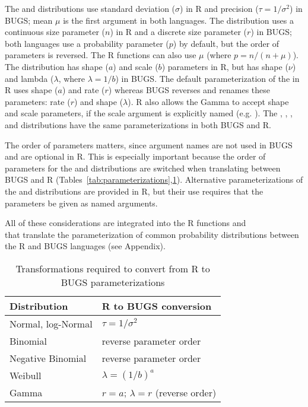   The  and  distributions use standard deviation ($\sigma$) in R and precision ($\tau=1/\sigma^2$) in BUGS; mean $\mu$ is the first argument in both languages.
  The  distribution uses a continuous size parameter ($n$) in R and a discrete size parameter ($r$) in BUGS; both languages use a probability parameter ($p$) by default, but the order of parameters is reversed. 
  The R functions  can also use $\mu$ (where $p=n/(n+\mu)$).
  The  distribution has shape ($a$) and scale ($b$) parameters in R, but has shape ($\nu$) and lambda ($\lambda$, where $\lambda=1/b$) in BUGS.
  The default parameterization of the  in R uses shape ($a$) and rate ($r$) whereas BUGS reverses and renames these parameters: rate ($r$) and shape ($\lambda$).
  R also allows the Gamma to accept shape and scale parameters, if the scale argument is explicitly named (e.g. ).
  The , , , and  distributions have the same parameterizations in both BUGS and R.

  The order of parameters matters, since argument names are not used in BUGS and are optional in R.
  This is especially important because the order of parameters for the  and  distributions are switched when translating between BUGS and R (Tables~\ref{tab:parameterizations},\ref{tab:transformations}).
  Alternative parameterizations of the  and  distributions are provided in R, but their use requires that the parameters be given as named arguments.

 All of these considerations are integrated into the R functions  and \\  that translate the parameterization of common probability distributions between the R and BUGS languages (see Appendix).

\begin{table}
\begin{center}
\begin{tabular}{ll}
\toprule
 Distribution        &  R to BUGS conversion                      \\
\midrule
 Normal, log-Normal  &  $\tau = 1/\sigma^2$                   \\
 Binomial            &  reverse parameter order                \\
 Negative Binomial   &  reverse parameter order \\
 Weibull             &  $\lambda = (1/b)^{a}$  \\
 Gamma               &  $r = a$; $\lambda = r$ (reverse order)                           \\
\bottomrule
\end{tabular}
\end{center}
\caption{Transformations required to convert from R to BUGS parameterizations}
\label{tab:transformations}
\end{table}

